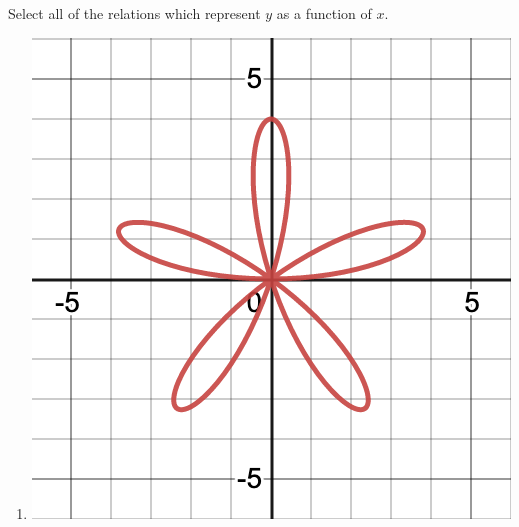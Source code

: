 \documentclass{ximera}
\author{Elizabeth Campolongo}
\begin{document}
\begin{exercise}
Select all of the relations which represent  $y$ as a function of $x$.
\begin{enumerate}
\item{\includegraphics[width=.5\linewidth]{petalgraph.png}}
\end{enumerate}

\begin{selectAll}
\end{selectAll}

\end{exercise}
\end{document}
